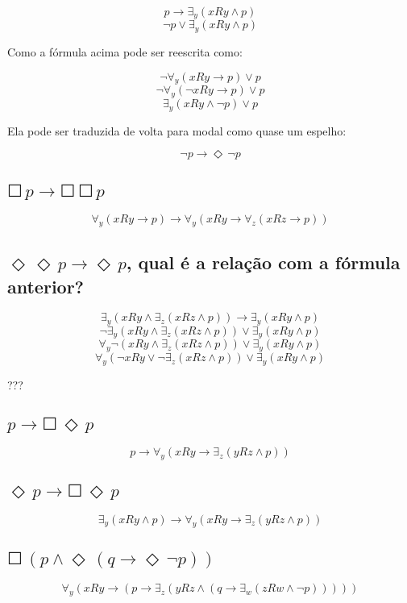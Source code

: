 \documentclass[11pt]{article}
\newcommand{\sq}{\Square \,}
\newcommand{\di}{\Diamond \,}
\newcommand{\imp}{\rightarrow}
\begin{document}
\[p \imp \exists_y ( xRy \land p ) \]
\[\lnot p \lor \exists_y ( xRy \land p ) \]

Como a fórmula acima pode ser reescrita como:

\[ \lnot \forall_y ( xRy \imp p ) \lor p \]
\[ \lnot \forall_y ( \lnot xRy \imp p ) \lor p \]
\[ \exists_y (xRy \land \lnot p ) \lor p \]

Ela pode ser traduzida de volta para modal como quase um espelho:

\[\lnot p \imp \di \lnot p \]


\subsection{$ \sq p \imp \sq\sq p $}

\[ \forall_y ( xRy \imp p ) \imp \forall_y ( xRy \imp \forall_z ( xRz \imp p ) ) \]

\subsection{$ \di\di p \imp \di p $, qual é a relação com a fórmula anterior?}

\[ \exists_y ( xRy \land \exists_z ( xRz \land p ) ) \imp \exists_y ( xRy \land p ) \]
\[ \lnot \exists_y ( xRy \land \exists_z ( xRz \land p ) ) \lor \exists_y ( xRy \land p ) \]
\[ \forall_y \lnot ( xRy \land \exists_z ( xRz \land p ) ) \lor \exists_y ( xRy \land p ) \]
\[ \forall_y ( \lnot xRy \lor \lnot \exists_z ( xRz \land p ) ) \lor \exists_y ( xRy \land p ) \]

???

\subsection{$ p \imp \sq\di p $}

\[p \imp \forall_y(xRy \imp \exists_z( yRz \land p))\]

\subsection{$ \di p \imp \sq\di p $}

\[\exists_y(xRy \land p) \imp \forall_y(xRy \imp \exists_z( yRz \land p))\]

\subsection{$ \sq( p \land \di(q \imp \di \lnot p) )$}
\[ \forall_y(xRy \imp ( p \imp \exists_z (yRz \land ( q \imp \exists_w ( zRw \land \lnot p ) ) ) ) ) \]
\end{document}
